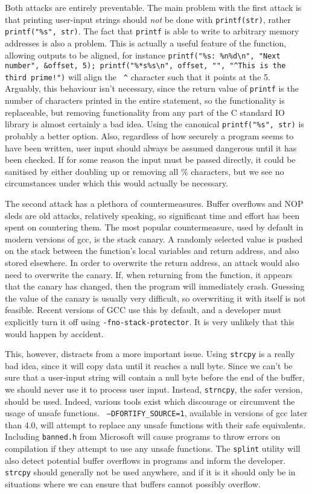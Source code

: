 Both attacks are entirely preventable. The main problem with the first attack is that printing user-input strings should
\emph{not} be done with {\tt printf(str)}, rather {\tt printf("\%s", str)}. The fact that {\tt printf} is able to write
to arbitrary memory addresses is also a problem. This is actually a useful feature of the function, allowing outputs to
be aligned, for instance {\tt printf("\%s: \%n\%d\textbackslash n", "Next number", \&offset, 5);
printf("\%*s\%s\textbackslash n", offset, "", "\textasciicircum This is the third prime!")} will align the {\tt
\textasciicircum} character such that it points at the 5. Arguably, this behaviour isn't necessary, since the return
value of {\tt printf} is the number of characters printed in the entire statement, so the functionality is replaceable,
but removing functionality from any part of the C standard IO library is almost certainly a bad idea. Using the
canonical {\tt printf("\%s", str)} is probably a better option. Also, regardless of how securely a program seems to have
been written, user input should always be assumed dangerous until it has been checked. If for some reason the input must
be passed directly, it could be sanitised by either doubling up or removing all \% characters, but we see no
circumstances under which this would actually be necessary.

The second attack has a plethora of countermeasures. Buffer overflows and NOP sleds are old attacks, relatively
speaking, so significant time and effort has been spent on countering them. The most popular countermeasure, used by
default in modern versions of gcc, is the stack canary. A randomly selected value is pushed on the stack between the
function's local variables and return address, and also stored elsewhere. In order to overwrite the return address, an
attack would also need to overwrite the canary. If, when returning from the function, it appears that the canary has
changed, then the program will immediately crash. Guessing the value of the canary is usually very difficult, so
overwriting it with itself is not feasible. Recent versions of GCC use this by default, and a developer must explicitly
turn it off using {\tt -fno-stack-protector}. It is very unlikely that this would happen by accident.

This, however, distracts from a more important issue. Using {\tt strcpy} is a really bad idea, since it will copy data
until it reaches a null byte. Since we can't be sure that a user-input string will contain a null byte before the end of
the buffer, we should never use it to process user input. Instead, {\tt strncpy}, the safer version, should be used.
Indeed, various tools exist which discourage or circumvent the usage of unsafe functions. {\tt
--DFORTIFY\_SOURCE=1}\cite{fort_source}, available in versions of gcc later than 4.0, will attempt to replace any unsafe
functions with their safe equivalents. Including {\tt banned.h} from Microsoft\cite{banned} will cause programs to throw
errors on compilation if they attempt to use any unsafe functions. The {\tt splint} utility will also detect potential
buffer overflows in programs and inform the developer. {\tt strcpy} should generally not be used anywhere, and if it is
it should only be in situations where we can ensure that buffers cannot possibly overflow.

